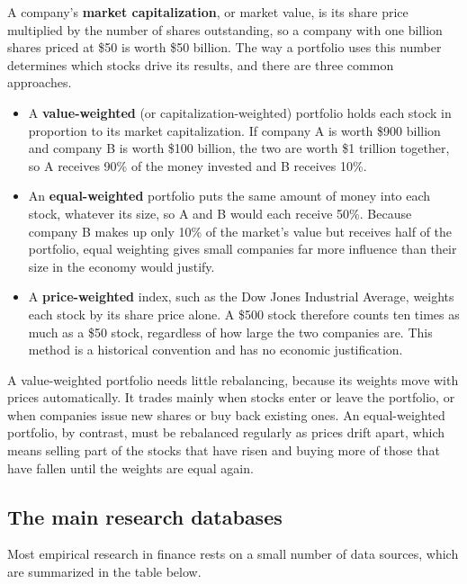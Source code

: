 A company's \textbf{market capitalization}, or market value, is its share price multiplied by the number of shares outstanding, so a company with one billion shares priced at \$50 is worth \$50 billion. The way a portfolio uses this number determines which stocks drive its results, and there are three common approaches.

\begin{itemize}
  \item A \textbf{value-weighted} (or capitalization-weighted) portfolio holds each stock in proportion to its market capitalization. If company A is worth \$900 billion and company B is worth \$100 billion, the two are worth \$1 trillion together, so A receives 90\% of the money invested and B receives 10\%.
  \item An \textbf{equal-weighted} portfolio puts the same amount of money into each stock, whatever its size, so A and B would each receive 50\%. Because company B makes up only 10\% of the market's value but receives half of the portfolio, equal weighting gives small companies far more influence than their size in the economy would justify.
  \item A \textbf{price-weighted} index, such as the Dow Jones Industrial Average, weights each stock by its share price alone. A \$500 stock therefore counts ten times as much as a \$50 stock, regardless of how large the two companies are. This method is a historical convention and has no economic justification.
\end{itemize}

A value-weighted portfolio needs little rebalancing, because its weights move with prices automatically. It trades mainly when stocks enter or leave the portfolio, or when companies issue new shares or buy back existing ones. An equal-weighted portfolio, by contrast, must be rebalanced regularly as prices drift apart, which means selling part of the stocks that have risen and buying more of those that have fallen until the weights are equal again.


\subsection{The main research databases}

Most empirical research in finance rests on a small number of data sources, which are summarized in the table below.

